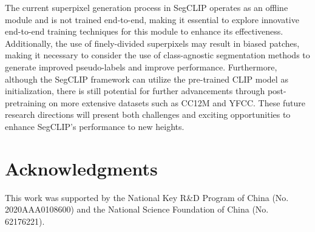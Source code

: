 \documentclass{article}
\theoremstyle{plain}
\theoremstyle{definition}
\theoremstyle{remark}
\begin{document}
The current superpixel generation process in SegCLIP operates as an offline module and is not trained end-to-end, making it essential to explore innovative end-to-end training techniques for this module to enhance its effectiveness. Additionally, the use of finely-divided superpixels may result in biased patches, making it necessary to consider the use of class-agnostic segmentation methods to generate improved pseudo-labels and improve performance. Furthermore, although the SegCLIP framework can utilize the pre-trained CLIP model as initialization, there is still potential for further advancements through post-pretraining on more extensive datasets such as CC12M and YFCC. These future research directions will present both challenges and exciting opportunities to enhance SegCLIP's performance to new heights. 

\section*{Acknowledgments}
This work was supported by the National Key R\&D Program of China (No. 2020AAA0108600) and the National Science Foundation of China (No. 62176221).



\end{document}
